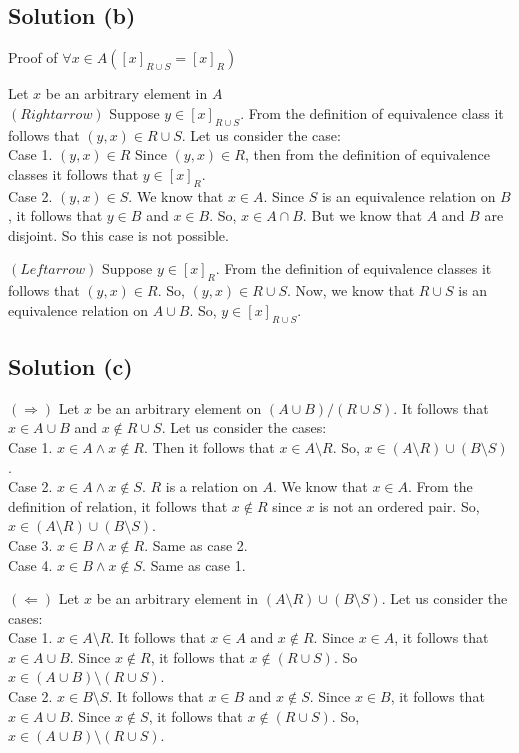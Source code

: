 \documentclass{article}
\begin{document}
\subsection{Solution (b)}
Proof of $\forall x \in A ([x]_{R \cup S} = [x]_R)$

Let $x$ be an arbitrary element in $A$
\\ $(Rightarrow)$ Suppose $y \in [x]_{R \cup S}$. From the definition
of equivalence class it follows that $(y,x) \in R \cup S$. Let us
consider the case:
\\ Case 1. $(y,x) \in R$ Since $(y,x) \in R$, then from the definition of
equivalence classes it follows that $y \in [x]_R$.
\\ Case 2. $(y,x) \in S$. We know that $x \in A$. Since $S$ is an
equivalence relation on $B$, it follows that $y \in B$ and $x \in B$.
So, $x \in A \cap B$. But we know that $A$ and $B$ are disjoint. So
this case is not possible.

$(Leftarrow)$ Suppose $y \in [x]_R$. From the definition of
equivalence classes it follows that $(y,x) \in R$. So, $(y,x) \in R
\cup S$. Now, we know that $R \cup S$ is an equivalence relation on $A
\cup B$. So, $y \in [x]_{R \cup S}$.

\subsection{Solution (c)}
$(\Rightarrow)$ Let $x$ be an arbitrary element on $(A \cup B)
/ (R \cup S)$. It follows that $x \in A \cup B$ and $x \notin R \cup
S$. Let us consider the cases:
\\ Case 1. $x \in A \land x \notin R$. Then it follows that $x \in
A \setminus R$. So, $x \in (A \setminus R) \cup (B \setminus S)$.
\\ Case 2. $x \in A \land x \notin S$. $R$ is a relation on $A$. We
know that $x \in A$. From the definition of relation, it follows that
$x \notin R$ since $x$ is not an ordered pair. So, $x \in (A \setminus
R) \cup (B \setminus S)$.
\\ Case 3. $x \in B \land x \notin R$. Same as case 2.
\\ Case 4. $x \in B \land x \notin S$. Same as case 1.

$(\Leftarrow)$ Let $x$ be an arbitrary element in $(A \setminus R)
\cup (B \setminus S)$. Let us consider the cases:
\\ Case 1. $x \in A \setminus R$. It follows that $x \in A$ and $x
\notin R$. Since $x \in A$, it follows that $x \in A \cup B$. Since $x
\notin R$, it follows that $x \notin (R \cup S)$. So $x \in (A \cup B)
\setminus (R \cup S)$.
\\ Case 2. $x \in B \setminus S$. It follows that $x \in B$ and $x
\notin S$. Since $x \in B$, it follows that $x \in A \cup B$. Since $x
\notin S$, it follows that $x \notin (R \cup S)$. So, $x \in (A \cup
B) \setminus (R \cup S)$.
\end{document}
